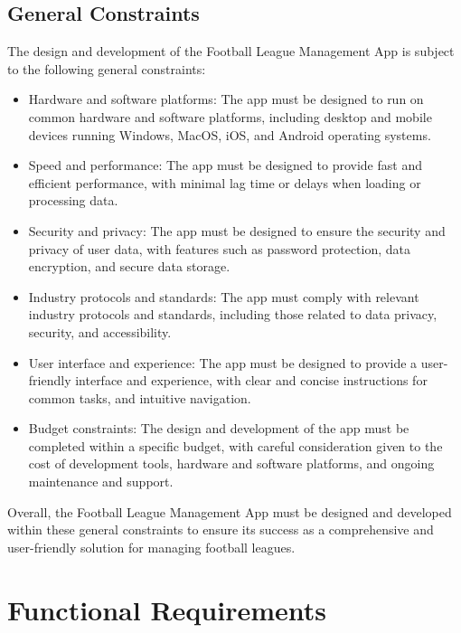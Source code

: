 \documentclass[12pt]{article}
\begin{document}
\subsection{ General Constraints}
The design and development of the Football League Management App is subject to the following general constraints:
\begin{itemize}
    \item Hardware and software platforms: The app must be designed to run on common hardware and software platforms, including desktop and mobile devices running Windows, MacOS, iOS, and Android operating systems.

    \item Speed and performance: The app must be designed to provide fast and efficient performance, with minimal lag time or delays when loading or processing data.

    \item Security and privacy: The app must be designed to ensure the security and privacy of user data, with features such as password protection, data encryption, and secure data storage.

    \item Industry protocols and standards: The app must comply with relevant industry protocols and standards, including those related to data privacy, security, and accessibility.

    \item User interface and experience: The app must be designed to provide a user-friendly interface and experience, with clear and concise instructions for common tasks, and intuitive navigation.

    \item Budget constraints: The design and development of the app must be completed within a specific budget, with careful consideration given to the cost of development tools, hardware and software platforms, and ongoing maintenance and support.
\end{itemize}
Overall, the Football League Management App must be designed and developed within these general constraints to ensure its success as a comprehensive and user-friendly solution for managing football leagues.


\section{Functional Requirements}



\end{document}
